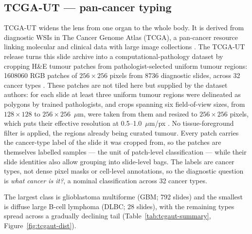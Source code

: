 \documentclass[11pt]{article}
\begin{document}
\subsection{TCGA-UT --- pan-cancer typing}
\label{sec:tcgaut}
TCGA-UT widens the lens from one organ to the whole body. It is derived from diagnostic WSIs in The
Cancer Genome Atlas (TCGA), a pan-cancer resource linking molecular and clinical data with large
image collections \citep{tomczak2015reviewThe}. The TCGA-UT release turns this slide archive into a
computational-pathology dataset by cropping H\&E tumour patches from pathologist-selected uniform
tumour regions: \num{1608060} RGB patches of $256\times256$ pixels from \num{8736} diagnostic slides,
across \num{32} cancer types \citep{komura2022universalEncoding}. These patches are not tiled here but
supplied by the dataset authors: for each slide at least three uniform tumour regions were delineated
as polygons by trained pathologists, and crops spanning six field-of-view sizes, from
$128\times128$ to $256\times256$~$\mu$m, were taken from them and resized to $256\times256$ pixels,
which puts their effective resolution at \num{0.5}--\num{1.0}~$\mu$m/px \citep{komura2022universalEncoding}.
No tissue-foreground filter is applied, the regions already being curated tumour. Every patch carries
the cancer-type label of the slide it was cropped from, so the patches are themselves labelled samples --- the unit
of patch-level classification --- while their slide identities also allow grouping into slide-level
bags. The labels are cancer types, not dense pixel masks or cell-level annotations, so the diagnostic
question is \emph{what cancer is it?}, a nominal classification across 32 cancer types.

The largest class is glioblastoma multiforme (GBM; \num{792} slides) and the smallest is diffuse
large B-cell lymphoma (DLBC; \num{28} slides), with the remaining types spread across a gradually
declining tail (Table~\ref{tab:tcgaut-summary}, Figure~\ref{fig:tcgaut-dist}).
\end{document}
